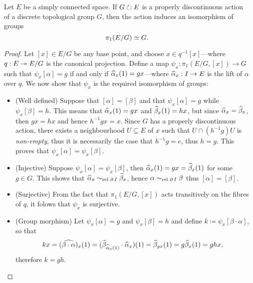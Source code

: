 \begin{proposition}
    \label{prop:prop-disc-and-1-connected-simply-connected-iso-grps}
    Let \(E\) be a simply connected space. If \(G \circlearrowright E\) is a properly
    discontinuous action of a discrete topological group \(G\), then the action
    induces an isomorphism of groups
    \[
        \pi_1(E/G) \simeq G.
    \]
\end{proposition}

\begin{proof}
    Let \([x] \in E/G\) be any base point, and choose \(x \in q^{-1}[x]\)---where
    \(q: E \twoheadrightarrow E/G\) is the canonical projection. Define a map
    \(\psi_x: \pi_1(E/G, [x]) \to G\) such that \(\psi_x[\alpha] = g\) if and only
    if \(\widehat \alpha_x(1) = g x\)---where \(\widehat \alpha_x: I \to E\) is the lift of
    \(\alpha\) over \(q\). We now show that \(\psi_x\) is the required isomorphism
    of groups:
    \begin{itemize}\setlength\itemsep{0em}
        \item (Well defined) Suppose that \([\alpha] = [\beta]\) and that
              \(\psi_x[\alpha] = g\) while \(\psi_x[\beta] = h\). This means that
              \(\widehat \alpha_x(1) = g x\) and \(\widehat \beta_x(1) = h x\), but since
              \(\widehat \alpha_x = \widehat \beta_x\), then \(g x = h x\) and hence
              \(h^{-1} g x = x\). Since \(G\) has a properly discontinuous action, there
              exists a neighbourhood \(U \subseteq E\) of \(x\) such that
              \(U \cap (h^{-1} g) U\) is \emph{non-empty}, thus it is necessarily the case
              that \(h^{-1} g = e\), thus \(h = g\). This proves that
              \(\psi_x[\alpha] = \psi_x[\beta]\).

        \item (Injective) Suppose \(\psi_x [\alpha] = \psi_x [\beta]\), then
              \(\widehat \alpha_x(1) = g x = \widehat \beta_x(1)\) for some \(g \in G\). This
              shows that \(\widehat \alpha_x \sim_{\text{rel }{\operatorname{\partial}I}} \widehat \beta_x\), hence
              \(\alpha \sim_{\text{rel }{\operatorname{\partial}I}} \beta\) thus \([\alpha] = [\beta]\).

        \item (Surjective) From the fact that \(\pi_1(E/G, [x])\) acts transitively on
              the fibres of \(q\), it folows that \(\psi_x\) is surjective.

        \item (Group morphism) Let \(\psi_x[\alpha] = g\) and \(\psi_x [\beta] = h\) and
              define \(k \coloneq \psi_x[\beta \cdot \alpha]\), so that
              \[
                  k x = (\widehat{\beta \cdot \alpha})_x(1)
                  = (\widehat \beta_{\widehat \alpha_x(1)} \cdot \widehat \alpha_x)(1)
                  = \widehat \beta_{g x}(1)
                  = g \widehat \beta_x(1)
                  = g h x,
              \]
              therefore \(k = g h\).
    \end{itemize}
\end{proof}

